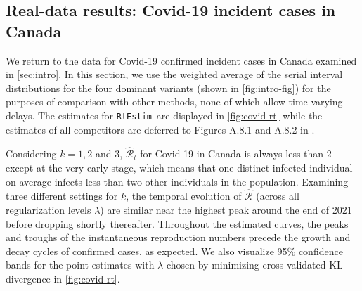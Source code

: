 \documentclass[10pt,letterpaper]{article}
\def\RtEstim{\texttt{RtEstim}}
\def\calR{\mathcal{R}}
\begin{document}
\subsection{Real-data results: Covid-19 incident cases in Canada}

We return to the data for Covid-19 confirmed incident cases in Canada examined
in \autoref{sec:intro}. In this section, we use the weighted average of the
serial interval distributions for the four dominant variants (shown in
\autoref{fig:intro-fig}) for the purposes of comparison with other methods, none
of which allow time-varying delays. The estimates for \RtEstim\ are displayed in
\autoref{fig:covid-rt} while the estimates of all competitors are deferred to
Figures A.8.1 and A.8.2 in . 

Considering $k=1,2$ and 3, $\widehat{\calR}_t$ for Covid-19 in Canada is always
less than $2$ except at the very early stage, which means that one distinct
infected individual on average infects less than two other individuals in the
population. Examining three different settings for $k$, the temporal evolution
of $\widehat{\calR}$ (across all regularization levels $\lambda$) are similar
near the highest peak around the end of 2021 before dropping shortly thereafter.
Throughout the estimated curves, the peaks and troughs of the instantaneous
reproduction numbers precede the growth and decay cycles of confirmed cases, as
expected. We also visualize 95\% confidence bands for the point estimates with
$\lambda$ chosen by minimizing cross-validated KL divergence in
\autoref{fig:covid-rt}.     
\end{document}
